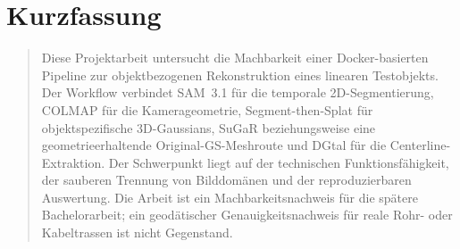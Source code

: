 \documentclass[12pt,a4paper]{article}
\newif\ifincludeappendices
\begin{document}
\section*{Kurzfassung}
\begin{abstract}
Diese Projektarbeit untersucht die Machbarkeit einer Docker-basierten Pipeline zur
objektbezogenen Rekonstruktion eines linearen Testobjekts. Der Workflow verbindet
SAM~3.1 für die temporale 2D-Segmentierung, COLMAP für die Kamerageometrie,
Segment-then-Splat für objektspezifische 3D-Gaussians, SuGaR beziehungsweise eine
geometrieerhaltende Original-GS-Meshroute und DGtal für die Centerline-Extraktion.
Der Schwerpunkt liegt auf der technischen Funktionsfähigkeit, der sauberen
Trennung von Bilddomänen und der reproduzierbaren Auswertung. Die Arbeit ist ein
Machbarkeitsnachweis für die spätere Bachelorarbeit; ein geodätischer
Genauigkeitsnachweis für reale Rohr- oder Kabeltrassen ist nicht Gegenstand.
\end{abstract}
\clearpage

\tableofcontents
\listoffigures
\listoftables
\clearpage
{}











\ifincludeappendices
\appendix







\fi

\nocite{metaSam3,colmapProject,dgtalProject,scan2bimImplementation,matrixRestResults}
\printbibliography[heading=bibintoc,title={Literatur und Referenzen}]
\end{document}
